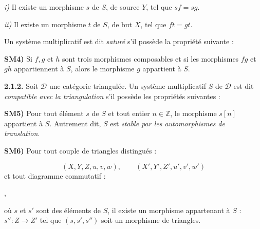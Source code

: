 \clearpage
{}%
\begingroup
\small
\setlength{\emergencystretch}{1.5em}%
\setlength{\abovedisplayskip}{3pt plus 2pt minus 2pt}%
\setlength{\belowdisplayskip}{3pt plus 2pt minus 2pt}%

\noindent\textit{i)} Il existe un morphisme $s$ de $S$, de source $Y$, tel que
$sf=sg$.

\noindent\textit{ii)} Il existe un morphisme $t$ de $S$, de but $X$, tel que
$ft=gt$.

\noindent Un système multiplicatif est dit \emph{saturé} s'il possède la
propriété suivante :

\smallskip
\noindent\textbf{SM4)} Si $f,g$ et $h$ sont trois morphismes composables et si
les morphismes $fg$ et $gh$ appartiennent à $S$, alors le morphisme $g$
appartient à $S$.

\medskip
\noindent\textbf{2.1.2.}\quad
{}
Soit $\mathcal D$ une catégorie triangulée. Un système multiplicatif $S$ de
$\mathcal D$ est dit \emph{compatible avec la triangulation} s'il possède les
propriétés suivantes :

\smallskip
\noindent\textbf{SM5)} Pour tout élément $s$ de $S$ et tout entier
$n\in\mathbb Z$, le morphisme $s[n]$ appartient à $S$. Autrement dit, $S$ est
\emph{stable par les automorphismes de translation}.

\smallskip
\noindent\textbf{SM6)} Pour tout couple de triangles distingués :

\[
  (X,Y,Z,u,v,w), \qquad (X',Y',Z',u',v',w')
\]
\noindent et tout diagramme commutatif :

\begin{center}
  \quad ,
\end{center}
\noindent où $s$ et $s'$ sont des éléments de $S$, il existe un morphisme
appartenant à $S$ : $s''\colon Z\to Z'$ tel que $(s,s',s'')$ soit un morphisme
de triangles.

